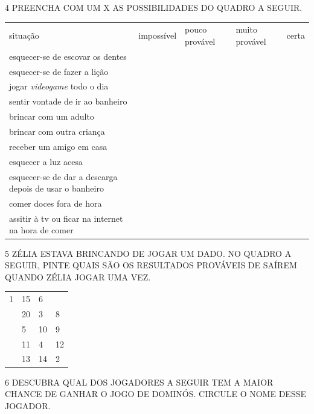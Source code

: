 \num{4} PREENCHA COM UM X AS POSSIBILIDADES DO QUADRO A SEGUIR.

\begin{longtable}[]{@{}lllll@{}}
\toprule
situação & impossível & pouco provável & muito provável &
certa\tabularnewline
esquecer-se de escovar os dentes & & & &\tabularnewline
esquecer-se de fazer a lição & & & &\tabularnewline
jogar \textit{videogame} todo o dia & & & &\tabularnewline
sentir vontade de ir ao banheiro & & & &\tabularnewline
brincar com um adulto & & & &\tabularnewline
brincar com outra criança & & & &\tabularnewline
receber um amigo em casa & & & &\tabularnewline
esquecer a luz acesa & & & &\tabularnewline
esquecer-se de dar a descarga depois de usar o banheiro & & &
&\tabularnewline
comer doces fora de hora & & & &\tabularnewline
assitir à tv ou ficar na internet na hora de comer & & & &\tabularnewline
\bottomrule
\end{longtable}


\num{5} ZÉLIA ESTAVA BRINCANDO DE JOGAR UM DADO. NO QUADRO A SEGUIR, PINTE QUAIS SÃO
OS RESULTADOS PROVÁVEIS DE SAÍREM QUANDO ZÉLIA JOGAR UMA VEZ.

\begin{longtable}[]{@{}llll@{}}
\toprule
1 & 15 & 6\tabularnewline
& 20 & 3 & 8\tabularnewline
& 5 & 10 & 9\tabularnewline
& 11 & 4 & 12\tabularnewline
& 13 & 14 & 2\tabularnewline
\bottomrule
\end{longtable}


\num{6} DESCUBRA QUAL DOS JOGADORES A SEGUIR TEM A MAIOR CHANCE DE GANHAR O JOGO
DE DOMINÓS. CIRCULE O NOME DESSE JOGADOR.


